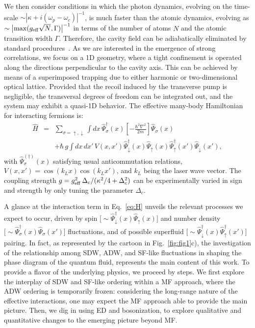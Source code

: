 \documentclass[pra,aps,superscriptaddress,twocolumn]{revtex4}
\begin{document}
We then consider conditions in which the photon dynamics, evolving on the time-scale
$\sim |\kappa+i(\omega_p-\omega_c)|^{-1}$, is much faster than the atomic dynamics,
evolving as $\sim \big| {\rm max} (g_{\rm eff}\sqrt{N},\Gamma) \big|^{-1}$ in terms of the number of atoms $N$
and the atomic transition width $\Gamma$. Therefore, the cavity field can be adiabatically eliminated by standard
procedures~\cite{GardinerZoller}. As we are interested in the emergence of strong correlations,
we focus on a 1D geometry, where a tight confinement is operated along the directions
perpendicular to the cavity axis. 
This can be achieved by means of a superimposed trapping due to either harmonic or two-dimensional
optical lattice. Provided that the recoil induced by the transverse pump is negligible, the transversal degrees of freedom can be integrated out,
and the system may exhibit a quasi-1D behavior. 
The effective many-body Hamiltonian for interacting fermions is:
\begin{eqnarray}
  \label{eq:H}
  \hat H & = & \sum_{\sigma=\uparrow,\downarrow}\int dx \, \hat \Psi^\dagger_{\sigma}(x) \left[-\frac{\hbar^2\nabla^2}{2m}\right] \hat \Psi_{\sigma}(x)\\
  &&+
  \hbar \, g\int dx \, dx' \, V(x,x') \hat \Psi^\dagger_\downarrow(x)\hat \Psi_\uparrow(x)\hat \Psi^\dagger_\uparrow(x')\hat \Psi_\downarrow(x'),\nonumber
\end{eqnarray}
with $\hat \Psi_\sigma^{(\dagger)}(x)$ satisfying usual anticommutation relations, $V(x,x') = \cos(k_Lx)\cos(k_Lx')$,
and $k_L$ being the laser wave vector.
The coupling strength $g = g_{\rm eff}^2\,{\Delta_c}/({\kappa^2/4+\Delta_c^2})$
can be experimentally varied in sign and strength by only tuning the parameter $\Delta_c$.

A glance at the interaction term in Eq.~\eqref{eq:H} unveils the relevant processes we expect to occur,
driven by spin $\big[ \sim \hat \Psi^\dagger_\downarrow(x)\hat \Psi_\uparrow(x) \big]$ and number density
$\big[ \sim \hat \Psi^\dagger_\sigma(x)\hat \Psi_\sigma(x') \big]$ fluctuations,
and of possible superfluid $\big[ \sim \hat \Psi^\dagger_\downarrow(x)\hat \Psi^\dagger_\uparrow(x') \big]$ pairing. In fact,
as represented by the cartoon in Fig.~\ref{fig:fig1}c), the investigation of the relationship among SDW, ADW,
and SF-like fluctuations in shaping the phase diagram of the quantum fluid, represents the main content of this work.
To provide a flavor of the underlying physics, we proceed by steps.
We first explore the interplay of SDW and SF-like ordering
within a MF approach, where the ADW ordering is temporarily frozen: considering the long-range nature
of the effective interactions, one may expect the MF approach able to provide the main picture. Then, we dig in
using ED and bosonization, to explore qualitative and quantitative changes to the emerging picture beyond MF.
\end{document}
